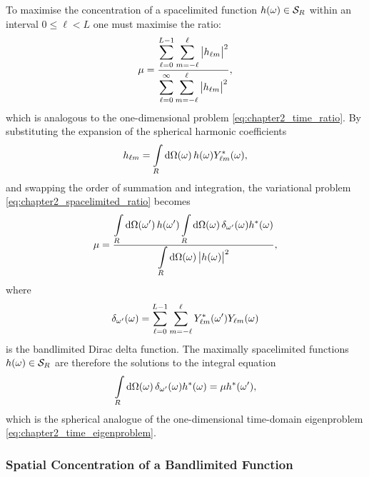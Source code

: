 To maximise the concentration of a spacelimited function \(\pixel{h} \in \spaceSpacelimit{}\) within an interval \(0 \leq \ell < L\) one must maximise the ratio:
%
\begin{equation}\label{eq:chapter2_spacelimited_ratio}
	\mu
	= \frac{\displaystyle\sum\limits_{\ell=0}^{L-1} \sum\limits_{m=-\ell}^{\ell} \abs{\harmonic{h}}^{2}}
	{\displaystyle\sum\limits_{\ell=0}^{\infty} \sum\limits_{m=-\ell}^{\ell} \abs{\harmonic{h}}^{2}},
\end{equation}
%
which is analogous to the one-dimensional problem \cref{eq:chapter2_time_ratio}.
By substituting the expansion of the spherical harmonic coefficients
%
\begin{equation}
	\harmonic{h}
	= \integrateRegion{\sphereVolume} \pixel{h} \pixel{\conj{\harmonic{Y}}},
\end{equation}
%
and swapping the order of summation and integration, the variational problem \cref{eq:chapter2_spacelimited_ratio} becomes
%
\begin{equation}
	\mu
	= \frac{\integrateRegion{\sphereVolume[']} \pixel[']{h} \integrateRegion{\sphereVolume} \pixel{\delta_{\omega'}} \pixel{\conj{h}}}
	{\integrateRegion{\sphereVolume} \abs{\pixel{h}}^{2}},
\end{equation}
%
where
%
\begin{equation}
	\pixel{\delta_{\omega'}}
	= \sum\limits_{\ell=0}^{L-1} \sum\limits_{m=-\ell}^{\ell} \pixel[']{\conj{\harmonic{Y}}} \pixel{\harmonic{Y}}
\end{equation}
%
is the bandlimited Dirac delta function.
The maximally spacelimited functions \(\pixel{h} \in \spaceSpacelimit{}\) are therefore the solutions to the integral equation
%
\begin{equation}
	\integrateRegion{\sphereVolume} \pixel{\delta_{\omega'}} \pixel{\conj{h}}
	= \mu \pixel[']{\conj{h}},
\end{equation}
%
which is the spherical analogue of the one-dimensional time-domain eigenproblem \cref{eq:chapter2_time_eigenproblem}.

\subsubsection{Spatial Concentration of a Bandlimited Function}


